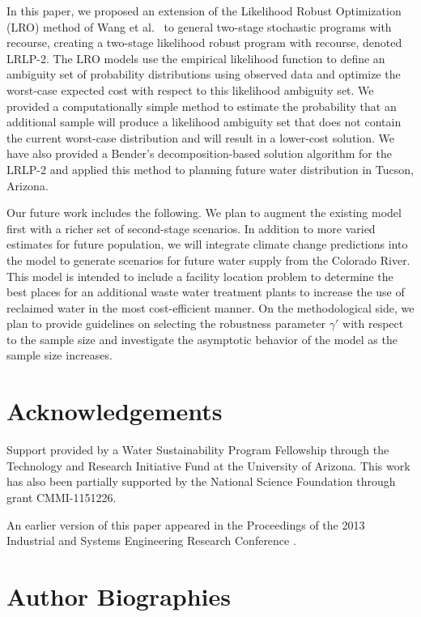\documentclass[11pt]{article}
\begin{document}
In this paper, we proposed an extension of the Likelihood Robust Optimization (LRO) method of Wang et al.\ \cite{wang2010likelihood} to general two-stage stochastic programs with recourse, creating a two-stage likelihood robust program with recourse, denoted LRLP-2.
The LRO models use the empirical likelihood function to define an ambiguity set of probability distributions using observed data and optimize the worst-case expected cost with respect to this likelihood ambiguity set.
We provided a computationally simple method to estimate the probability that an additional sample will produce a likelihood ambiguity set that does not contain the current worst-case distribution and will result in a lower-cost solution. 
We have also provided a Bender's decomposition-based solution algorithm for the LRLP-2 and applied this method to planning future water distribution in Tucson, Arizona.

Our future work includes the following. We plan to augment the existing model first with a richer set of second-stage scenarios.
In addition to more varied estimates for future population, we will integrate climate change predictions into the model to generate scenarios for future water supply from the Colorado River. 
This model is intended to include a facility location problem to determine the best places for an additional waste water treatment plants to increase the use of reclaimed water in the most cost-efficient manner. On the methodological side, we plan to provide guidelines on selecting the robustness parameter $\gamma'$ with respect to the sample size and investigate the asymptotic behavior of the model as the sample size increases. 

\section*{Acknowledgements}
Support provided by a Water Sustainability Program Fellowship through the Technology and Research Initiative Fund at the University of Arizona.
This work has also been partially supported by the National Science Foundation through grant CMMI-1151226.

An earlier version of this paper appeared in the Proceedings of the 2013 Industrial and Systems Engineering Research Conference \cite{love2013likelihood}.





\section*{Author Biographies}
\end{document}
